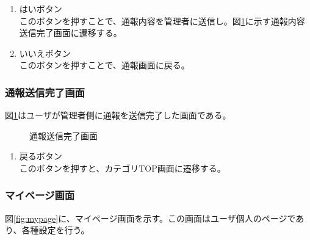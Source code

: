 \documentclass[a4j]{jarticle}
\begin{document}
\begin{enumerate}
  \renewcommand{\labelenumi}{\textcircled{\scriptsize \theenumi}}
\item はいボタン\\
  このボタンを押すことで、通報内容を管理者に送信し。図\ref{fig:report_ok}に示す通報内容送信完了画面に遷移する。
\item いいえボタン\\
  このボタンを押すことで、通報画面に戻る。
\end{enumerate}


\subsubsection{通報送信完了画面}
図\ref{fig:report_ok}はユーザが管理者側に通報を送信完了した画面である。
\begin{figure}[H]
\begin{center}
\caption{通報送信完了画面}
\label{fig:report_ok}
\end{center}
\end{figure}

\begin{enumerate}
  \renewcommand{\labelenumi}{\textcircled{\scriptsize \theenumi}}
\item 戻るボタン\\
このボタンを押すと、カテゴリTOP画面に遷移する。
\end{enumerate}


\subsubsection{マイページ画面}
図\ref{fig:mypage}に、マイページ画面を示す。この画面はユーザ個人のページであり、各種設定を行う。\\
\end{document}
